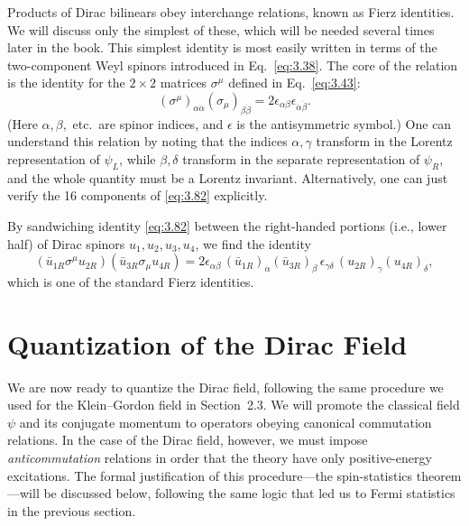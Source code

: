 Products of Dirac bilinears obey interchange relations, known as Fierz
identities.  We will discuss only the simplest of these, which will be needed
several times later in the book.  This simplest identity is most easily
written in terms of the two-component Weyl spinors introduced in
Eq.~\eqref{eq:3.38}.  The core of the relation is the identity for the
$2\times2$ matrices $\sigma^\mu$ defined in Eq.~\eqref{eq:3.43}:
\begin{equation}
  (\sigma^\mu)_{\alpha\dot{\alpha}}(\sigma_\mu)_{\beta\dot{\beta}}
    = 2\epsilon_{\alpha\beta}\epsilon_{\dot{\alpha}\dot{\beta}} .
  \label{eq:3.82}
\end{equation}
(Here $\alpha, \beta,$ etc.\ are spinor indices, and $\epsilon$ is the
antisymmetric symbol.)  One can understand this relation by noting that the
indices $\alpha, \gamma$ transform in the Lorentz representation of $\psi_L$,
while $\beta, \delta$ transform in the separate representation of $\psi_R$,
and the whole quantity must be a Lorentz invariant.  Alternatively, one can
just verify the 16 components of \eqref{eq:3.82} explicitly.

By sandwiching identity \eqref{eq:3.82} between the right-handed portions
(i.e., lower half) of Dirac spinors $u_1, u_2, u_3, u_4$, we find the identity
\begin{equation}
  (\bar{u}_{1R}\sigma^\mu u_{2R})(\bar{u}_{3R}\sigma_\mu u_{4R})
    = 2\epsilon_{\alpha\beta}\,
    (\bar{u}_{1R})_\alpha(\bar{u}_{3R})_\beta\,
    \epsilon_{\gamma\delta}\,
    (u_{2R})_\gamma(u_{4R})_\delta ,
  \label{eq:3.83}
\end{equation}
which is one of the standard Fierz identities.

\section{Quantization of the Dirac Field}

We are now ready to quantize the Dirac field, following the same procedure we
used for the Klein--Gordon field in Section~2.3.  We will promote the
classical field $\psi$ and its conjugate momentum to operators obeying
canonical commutation relations.  In the case of the Dirac field, however, we
must impose \emph{anticommutation} relations in order that the theory have
only positive-energy excitations.  The formal justification of this
procedure---the spin-statistics theorem---will be discussed below, following
the same logic that led us to Fermi statistics in the previous section.

